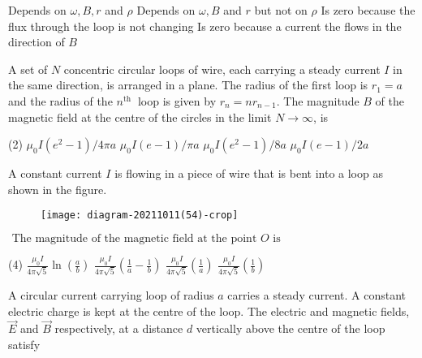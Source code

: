 \begin{enumerate}
\begin{tasks}
	\task[\textbf{A.}] Depends on $\omega, B, r$ and $\rho$
	\task[\textbf{B.}]Depends on $\omega, B$ and $r$ but not on $\rho$
	\task[\textbf{C.}]Is zero because the flux through the loop is not changing
	\task[\textbf{D.}]Is zero because a current the flows in the direction of $B$
\end{tasks}
\begin{minipage}{\textwidth}
	\item A set of $N$ concentric circular loops of wire, each carrying a steady current $I$ in the same direction, is arranged in a plane. The radius of the first loop is $r_{1}=a$ and the radius of the $n^{\text {th }}$ loop is given by $r_{n}=n r_{n-1}$. The magnitude $B$ of the magnetic field at the centre of the circles in the limit $N \rightarrow \infty$, is
\end{minipage}
\begin{tasks}(2)
	\task[\textbf{A.}] $\mu_{0} I\left(e^{2}-1\right) / 4 \pi a$
	\task[\textbf{B.}]$\mu_{0} I(e-1) / \pi a$
	\task[\textbf{C.}]$\mu_{0} I\left(e^{2}-1\right) / 8 a$
	\task[\textbf{D.}]$\mu_{0} I(e-1) / 2 a$
\end{tasks}
\begin{minipage}{\textwidth}
	\item A constant current $I$ is flowing in a piece of wire that is bent into a loop as shown in the figure.\\
	\begin{figure}[H]
		\centering
		\texttt{[image: diagram-20211011(54)-crop]}
	\end{figure}
	$\text { The magnitude of the magnetic field at the point } O \text { is }$
\end{minipage}
\begin{tasks}(4)
	\task[\textbf{A.}] $\frac{\mu_{0} I}{4 \pi \sqrt{5}} \ln \left(\frac{a}{b}\right)$
	\task[\textbf{B.}]$\frac{\mu_{0} I}{4 \pi \sqrt{5}}\left(\frac{1}{a}-\frac{1}{b}\right)$
	\task[\textbf{C.}]$\frac{\mu_{0} I}{4 \pi \sqrt{5}}\left(\frac{1}{a}\right)$
	\task[\textbf{D.}]$\frac{\mu_{0} I}{4 \pi \sqrt{5}}\left(\frac{1}{b}\right)$
\end{tasks}
\begin{minipage}{\textwidth}
	\item A circular current carrying loop of radius $a$ carries a steady current. A constant electric charge is kept at the centre of the loop. The electric and magnetic fields, $\vec{E}$ and $\vec{B}$ respectively, at a distance $d$ vertically above the centre of the loop satisfy

\end{minipage}
\end{enumerate}
